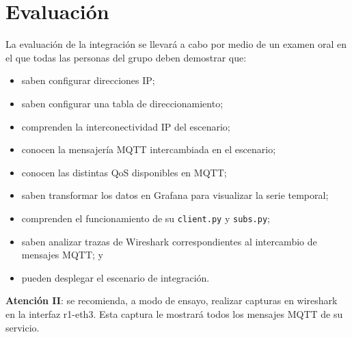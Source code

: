 \documentclass{upmassignment} \usepackage[spanish]{babel} \usepackage{ifthen} \usepackage{amsmath} \usepackage{amsfonts} \usepackage{booktabs}
\begin{document}
\section*{Evaluación}
La evaluación de la integración
se llevará a cabo por medio de un examen
oral en el que todas las personas del
grupo deben demostrar que:
\begin{itemize}
    \item saben configurar direcciones IP;
    \item saben configurar una tabla
        de direccionamiento;
    \item comprenden la interconectividad
        IP del escenario;
    \item conocen la mensajería MQTT
        intercambiada en el escenario;
    \item conocen las distintas QoS disponibles
        en MQTT;
    \item saben transformar los datos en
        Grafana para visualizar la
        serie temporal;
    \item comprenden el funcionamiento
        de su \texttt{client.py}
        y \texttt{subs.py};
    \item saben analizar trazas de
        Wireshark correspondientes al
        intercambio de mensajes MQTT; y
    \item pueden desplegar el escenario
        de integración.
\end{itemize}



\begin{tcolorbox}


    \textbf{Atención II}: se recomienda,
    a modo de ensayo, realizar capturas
    en wireshark en la interfaz
    r1-eth3. Esta captura le mostrará
    todos los mensajes MQTT de su servicio.
\end{tcolorbox}
\end{document}
